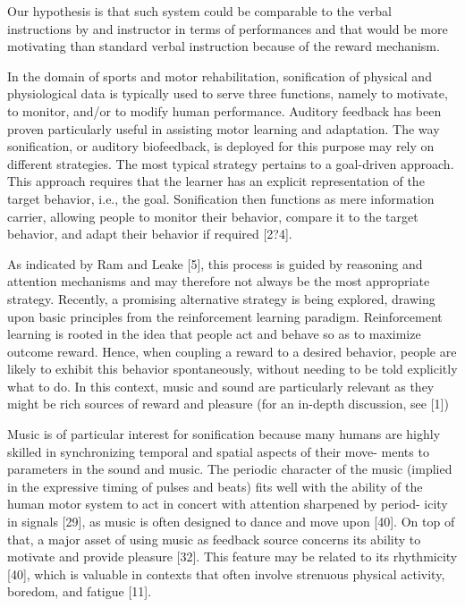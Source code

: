 \documentclass[10pt,letterpaper]{article}
\begin{document}
Our hypothesis is that such system could be comparable to the verbal instructions by and instructor in terms of performances and that would be more motivating than standard verbal instruction because of the reward mechanism.



In the domain of sports and motor rehabilitation, sonification of physical and physiological data is typically used to serve three functions, namely to motivate, to monitor, and/or to modify human performance. Auditory feedback has been proven particularly useful in assisting motor learning and adaptation. The way sonification, or auditory biofeedback, is deployed for this purpose may rely on different strategies. The most typical strategy pertains to a goal-driven approach. This approach requires that the learner has an explicit representation of the target behavior, i.e., the goal. Sonification then functions as mere information carrier, allowing people to monitor their behavior, compare it to the target behavior, and adapt their behavior if required [2?4]. 

As indicated by Ram and Leake [5], this process is guided by reasoning and attention mechanisms and may therefore not always be the most appropriate strategy. Recently, a promising alternative strategy is being explored, drawing upon basic principles from the reinforcement learning paradigm. Reinforcement learning is rooted in the idea that people act and behave so as to maximize outcome reward. Hence, when coupling a reward to a desired behavior, people are likely to exhibit this behavior spontaneously, without needing to be told explicitly what to do. In this context, music and sound are particularly relevant as they might be rich sources of reward and pleasure (for an in-depth discussion, see [1])

Music is of particular interest for sonification because many humans are highly skilled in synchronizing temporal and spatial aspects of their move- ments to parameters in the sound and music. The periodic character of the music (implied in the expressive timing of pulses and beats) fits well with the ability of the human motor system to act in concert with attention sharpened by period- icity in signals [29], as music is often designed to dance and move upon [40]. On top of that, a major asset of using music as feedback source concerns its ability to motivate and provide pleasure [32]. This feature may be related to its rhythmicity [40], which is valuable in contexts that often involve strenuous physical activity, boredom, and fatigue [11].
\end{document}
